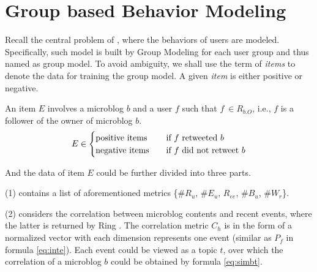 \section{Group based Behavior Modeling}
\label{sec:gm}


Recall the central problem of \sys{}, where the \retg{} behaviors of users are modeled.
Specifically, such model is built by Group Modeling for each user group and thus named as group model.
To avoid ambiguity, we shall use the term of \textit{items} to denote the data for training the group model.
A given \textit{item} is either positive or negative.

\begin{definition}
\label{def:gm-it}
An item $E$ involves a microblog $b$ and a user $f$ such that $f\ \in R_{b.O}$, i.e., $f$ is a follower of  the owner of microblog $b$.
\begin{equation}
\label{eq:gm-it}
E \in
  \begin{cases}
    \text{positive items}       & \quad \text{if } f \text{ retweeted{} } b\\
    \text{negative items}  		& \quad \text{if } f \text{ did not retweet{} } b
  \end{cases}
\end{equation}
\end{definition}

And the data of item $E$ could be further divided into three parts.

	\stab(1)  contains a list of aforementioned metrics \{\#$R_u$, \#$E_u$, $R_{ee}$, \#$B_u$, \#$W_r$\}.
	
	\stab(2)  considers the correlation between microblog contents and recent events, where the latter is returned by Ring \cite{IEEEexample:ring}. The correlation metric $C_h$ is in the form of a normalized vector with each dimension represents one event (similar as $P_f$ in formula \ref{eq:inte}). Each event could be viewed as a topic $t$, over which the correlation of a microblog $b$ could be obtained by formula \ref{eq:simbt}.
	
